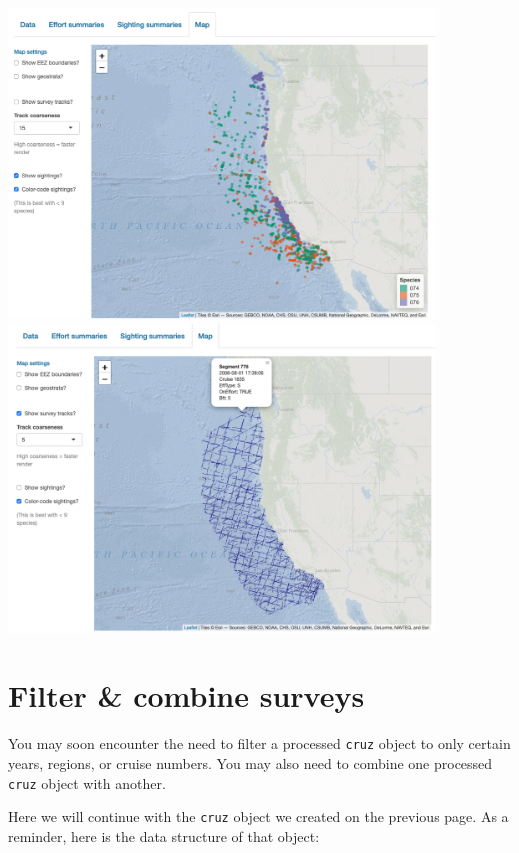 \documentclass[
]{book}
\begin{document}
~\\
\includegraphics[width=0.85\textwidth,height=\textheight]{img/app-4.png}
~\\
\includegraphics[width=0.85\textwidth,height=\textheight]{img/app-5.png}

\hypertarget{filter}{%
\chapter{Filter \& combine surveys}\label{filter}}

You may soon encounter the need to filter a processed \texttt{cruz} object to only certain years, regions, or cruise numbers. You may also need to combine one processed \texttt{cruz} object with another.

Here we will continue with the \texttt{cruz} object we created on the previous page. As a reminder, here is the data structure of that object:
\end{document}
